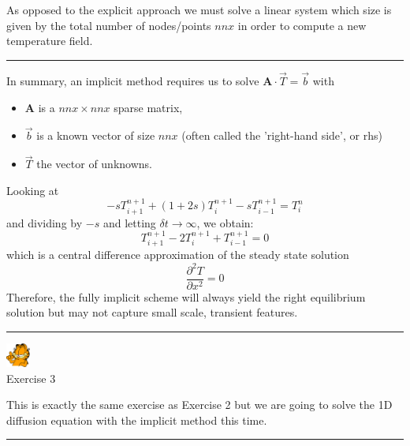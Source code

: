 \begin{center}
\begin{minipage}[t]{0.77\textwidth}
As opposed to the explicit approach we must solve a linear system which size is given 
by the total number of nodes/points $nnx$ in order to compute a new temperature field.

\par\noindent\rule{\textwidth}{0.4pt}
\end{minipage}
\end{center}


In summary, an implicit method requires us to solve ${\bm A}\cdot\vec{T} = \vec{b}$ with
\begin{itemize}
\item ${\bm A}$ is a $nnx \times nnx$  {\color{olive}sparse} matrix,
\item ${\vec b}$ is a known vector of size $nnx$ (often called the 'right-hand side', or {\color{olive} rhs})
\item ${\vec T}$ the vector of unknowns.
\end{itemize}



Looking at
\[
-s T_{i+1}^{n+1} + (1+2s) T_{i}^{n+1} - s T_{i-1}^{n+1} = T_i^{n}
\]
and dividing by $-s$ and letting $\delta t \rightarrow \infty$, we obtain:
\[
T_{i+1}^{n+1} -2 T_{i}^{n+1} + T_{i-1}^{n+1} = 0
\]
which is a central difference approximation of the steady state solution
\[
\frac{\partial^2 T }{\partial x^2}=0
\]
Therefore, the fully implicit scheme will always yield the right equilibrium solution 
but may not capture small scale, transient features.


\begin{center}
\begin{minipage}[t]{0.77\textwidth}
\par\noindent\rule{\textwidth}{0.4pt}

\begin{center}
\includegraphics[width=0.8cm]{images/garftr} \\
{\color{orange}Exercise 3}
\end{center}

This is exactly the same exercise as Exercise 2 but we 
are going to solve the 1D diffusion equation with the implicit method
this time. 

\par\noindent\rule{\textwidth}{0.4pt}
\end{minipage}
\end{center}


